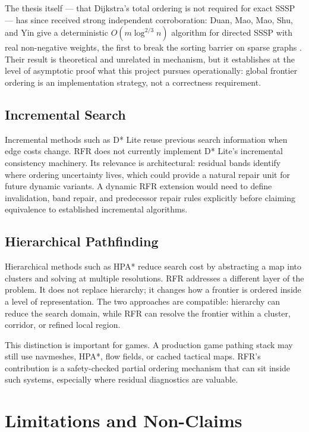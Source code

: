 \documentclass[11pt]{article}
\newcommand{\RFR}{\textsc{RFR}}
\begin{document}
The thesis itself --- that Dijkstra's total ordering is not required for exact SSSP --- has since received strong independent corroboration: Duan, Mao, Mao, Shu, and Yin give a deterministic $O(m\log^{2/3} n)$ algorithm for directed SSSP with real non-negative weights, the first to break the sorting barrier on sparse graphs \cite{duan2025}. Their result is theoretical and unrelated in mechanism, but it establishes at the level of asymptotic proof what this project pursues operationally: global frontier ordering is an implementation strategy, not a correctness requirement.

\subsection{Incremental Search}

Incremental methods such as D* Lite reuse previous search information when edge costs change. \RFR{} does not currently implement D* Lite's incremental consistency machinery. Its relevance is architectural: residual bands identify where ordering uncertainty lives, which could provide a natural repair unit for future dynamic variants. A dynamic \RFR{} extension would need to define invalidation, band repair, and predecessor repair rules explicitly before claiming equivalence to established incremental algorithms.

\subsection{Hierarchical Pathfinding}

Hierarchical methods such as HPA* \cite{botea2004} reduce search cost by abstracting a map into clusters and solving at multiple resolutions. \RFR{} addresses a different layer of the problem. It does not replace hierarchy; it changes how a frontier is ordered inside a level of representation. The two approaches are compatible: hierarchy can reduce the search domain, while \RFR{} can resolve the frontier within a cluster, corridor, or refined local region.

This distinction is important for games. A production game pathing stack may still use navmeshes, HPA*, flow fields, or cached tactical maps. \RFR{}'s contribution is a safety-checked partial ordering mechanism that can sit inside such systems, especially where residual diagnostics are valuable.

\section{Limitations and Non-Claims}
\label{sec:limitations}
\end{document}
